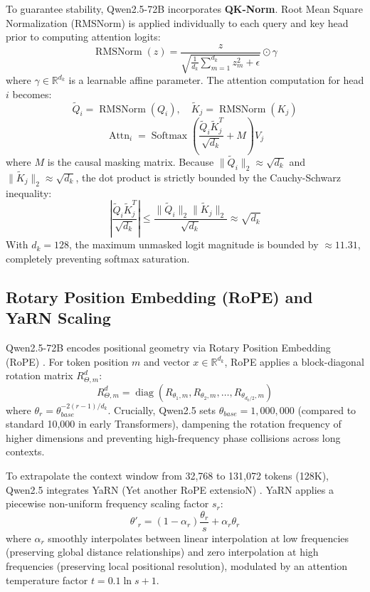 \documentclass[conference]{IEEEtran}
\begin{document}
To guarantee stability, Qwen2.5-72B incorporates \textbf{QK-Norm}. Root Mean Square Normalization (RMSNorm) \cite{zhang2019rmsnorm} is applied individually to each query and key head prior to computing attention logits:
\begin{equation}
\operatorname{RMSNorm}(z) = \frac{z}{\sqrt{\frac{1}{d_k} \sum_{m=1}^{d_k} z_m^2 + \epsilon}} \odot \gamma
\end{equation}
where $\gamma \in \mathbb{R}^{d_k}$ is a learnable affine parameter. The attention computation for head $i$ becomes:
\begin{equation}
\tilde{Q}_i = \operatorname{RMSNorm}(Q_i), \quad \tilde{K}_j = \operatorname{RMSNorm}(K_j)
\end{equation}
\begin{equation}
\operatorname{Attn}_i = \operatorname{Softmax}\left( \frac{\tilde{Q}_i \tilde{K}_j^T}{\sqrt{d_k}} + M \right) V_j
\end{equation}
where $M$ is the causal masking matrix. Because $\|\tilde{Q}_i\|_2 \approx \sqrt{d_k}$ and $\|\tilde{K}_j\|_2 \approx \sqrt{d_k}$, the dot product is strictly bounded by the Cauchy-Schwarz inequality:
\begin{equation}
\left| \frac{\tilde{Q}_i \tilde{K}_j^T}{\sqrt{d_k}} \right| \le \frac{\|\tilde{Q}_i\|_2 \|\tilde{K}_j\|_2}{\sqrt{d_k}} \approx \sqrt{d_k}
\end{equation}
With $d_k = 128$, the maximum unmasked logit magnitude is bounded by $\approx 11.31$, completely preventing softmax saturation.

\subsection{Rotary Position Embedding (RoPE) and YaRN Scaling}
Qwen2.5-72B encodes positional geometry via Rotary Position Embedding (RoPE) \cite{su2024roformer}. For token position $m$ and vector $x \in \mathbb{R}^{d_k}$, RoPE applies a block-diagonal rotation matrix $R_{\Theta, m}^d$:
\begin{equation}
R_{\Theta, m}^d = \operatorname{diag}\left( R_{\theta_1, m}, R_{\theta_2, m}, \dots, R_{\theta_{d_k/2}, m} \right)
\end{equation}
where $\theta_r = \theta_{base}^{-2(r-1)/d_k}$. Crucially, Qwen2.5 sets $\theta_{base} = 1,000,000$ (compared to standard 10,000 in early Transformers), dampening the rotation frequency of higher dimensions and preventing high-frequency phase collisions across long contexts.

To extrapolate the context window from 32,768 to 131,072 tokens (128K), Qwen2.5 integrates YaRN (Yet another RoPE extensioN) \cite{peng2023yarn}. YaRN applies a piecewise non-uniform frequency scaling factor $s_r$:
\begin{equation}
\theta'_r = (1 - \alpha_r) \frac{\theta_r}{s} + \alpha_r \theta_r
\end{equation}
where $\alpha_r$ smoothly interpolates between linear interpolation at low frequencies (preserving global distance relationships) and zero interpolation at high frequencies (preserving local positional resolution), modulated by an attention temperature factor $t = 0.1 \ln s + 1$.
\end{document}
